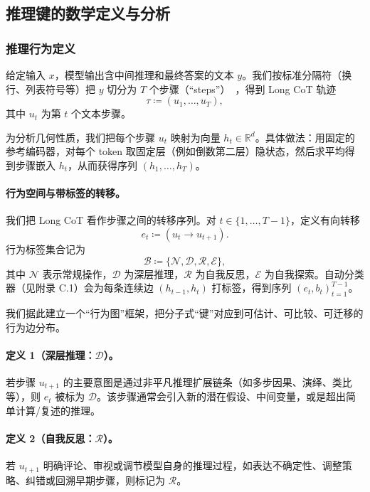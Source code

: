 \subsection{推理键的数学定义与分析}
\label{append:math}
\subsubsection{推理行为定义}
给定输入 \(x\)，模型输出含中间推理和最终答案的文本 \(y\)。我们按标准分隔符（换行、列表符号等）把 \(y\) 切分为 \(T\) 个步骤（“steps”）~\citep{golovneva2023roscoe,chen2024unlocking}，得到 Long CoT 轨迹
\begin{equation}
\tau \coloneqq (u_1,\ldots,u_T),
\end{equation}
其中 \(u_t\) 为第 $t$ 个文本步骤。

为分析几何性质，我们把每个步骤 \(u_t\) 映射为向量 \(h_t \in \mathbb{R}^d\)。具体做法：用固定的参考编码器，对每个 token 取固定层（例如倒数第二层）隐状态，然后求平均得到步骤嵌入 \(h_t\)，从而获得序列 \((h_1,\ldots,h_T)\)。

\paragraph{行为空间与带标签的转移。}
我们把 Long CoT 看作步骤之间的转移序列。对 \(t \in \{1,\ldots,T-1\}\)，定义有向转移
\begin{equation}
e_t \coloneqq (u_t \rightarrow u_{t+1}).
\end{equation}
行为标签集合记为
\begin{equation}
\mathcal{B} \coloneqq \{\mathcal{N},\mathcal{D},\mathcal{R},\mathcal{E}\},
\end{equation}
其中 \(\mathcal{N}\) 表示常规操作，\(\mathcal{D}\) 为深层推理，\(\mathcal{R}\) 为自我反思，\(\mathcal{E}\) 为自我探索。自动分类器（见附录 C.1）会为每条连续边 $(h_{t-1}, h_t)$ 打标签，得到序列 $(e_t,b_t)_{t=1}^{T-1}$。

我们据此建立一个“行为图”框架，把分子式“键”对应到可估计、可比较、可迁移的行为边分布。

\paragraph{定义 1（深层推理：\(\mathcal{D}\)）。}
若步骤 \(u_{t+1}\) 的主要意图是通过非平凡推理扩展链条（如多步因果、演绎、类比等），则 \(e_t\) 被标为 \(\mathcal{D}\)。该步骤通常会引入新的潜在假设、中间变量，或是超出简单计算/复述的推理。

\paragraph{定义 2（自我反思：\(\mathcal{R}\)）。}
若 \(u_{t+1}\) 明确评论、审视或调节模型自身的推理过程，如表达不确定性、调整策略、纠错或回溯早期步骤，则标记为 \(\mathcal{R}\)。

